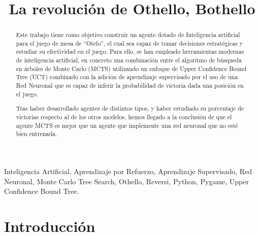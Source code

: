 \documentclass[conference,a4paper]{IEEEtran}
\begin{document}
\title{La revolución de Othello, Bothello}

\author{
  \and
}

\maketitle


\begin{abstract}
  Este trabajo tiene como objetivo construir un agente dotado de Inteligencia
  artificial para el juego de mesa de ``Otelo'', el cual sea capaz de tomar
  decisiones estratégicas y estudiar su efectividad en el juego. Para ello,
  se han empleado herramientas modernas de inteligencia artificial,
  en concreto una combinación entre el algoritmo de búsqueda en árboles de
  Monte Carlo (MCTS) utilizando un enfoque de Upper Confidence Bound Tree (UCT)
  combinado con la adición de aprendizaje supervisado por el uso de una Red Neuronal
  que es capaz de inferir la probabilidad de victoria dada una posición en el juego.

  Tras haber desarrollado agentes de distintos tipos, y haber estudiado su porcentaje
  de victorias respecto al de los otros modelos, hemos llegado a la conclusión de que
  el agente MCTS es mejor que un agente que implemente una red neuronal que no esté
  bien entrenada.
\end{abstract}


\begin{IEEEkeywords}
  Inteligencia Artificial, Aprendizaje por Refuerzo, Aprendizaje Supervisado, 
  Red Neuronal, Monte Carlo Tree Search, Othello, Reversi, Python, Pygame,
  Upper Confidence Bound Tree.
\end{IEEEkeywords}


\section{Introducción}
\end{document}
